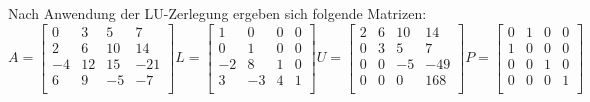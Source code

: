 \documentclass[course=erap]{aspdoc}
\begin{document}
\noindent\hspace*{15mm}%
Nach Anwendung der LU-Zerlegung ergeben sich folgende Matrizen:
 \begin{equation}

 A = \begin{bmatrix}
 0	& 3	 & 5  & 7 \\
 2	& 6	 & 10 & 14 \\
-4	& 12 & 15 & -21\\
 6	& 9  & -5 & -7\\
 \end{bmatrix}
  L =
 \begin{bmatrix}
 1	& 0	 & 0  & 0 \\
 0	& 1	 & 0 & 0 \\
-2	& 8 & 1 & 0\\
 3	& -3  & 4 & 1\\
 \end{bmatrix}
 U =
\begin{bmatrix}
 2	& 6	 & 10 & 14 \\
 0	& 3	 & 5 &  7 \\
 0	& 0  & -5 & -49\\
 0	& 0  & 0 &  168\\
 \end{bmatrix}
 P =
 \begin{bmatrix}
 0	& 1	 & 0 & 0 \\
 1	& 0	 & 0 & 0 \\
 0	& 0  & 1 & 0\\
 0	& 0  & 0 & 1\\
 \end{bmatrix}
 \end{equation}
 
 
\end{document}
